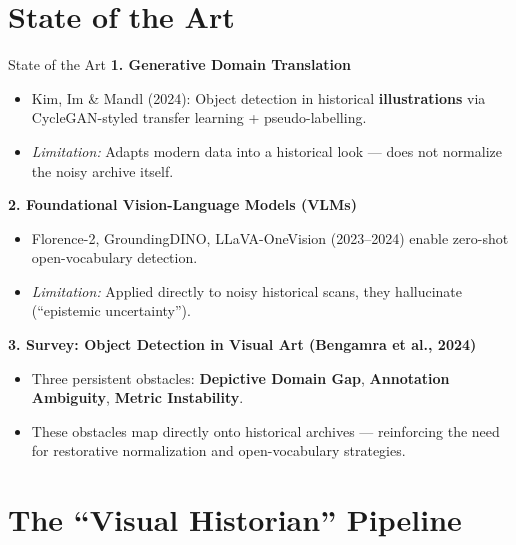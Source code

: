 \documentclass[aspectratio=169, 10pt]{beamer}
\begin{document}
\section{State of the Art}

\begin{frame}{State of the Art}
    \textbf{1. Generative Domain Translation}
    \begin{itemize}
        \item Kim, Im \& Mandl (2024): Object detection in historical \textbf{illustrations} via CycleGAN-styled transfer learning + pseudo-labelling.
        \item \textit{Limitation:} Adapts modern data into a historical look --- does not normalize the noisy archive itself.
    \end{itemize}

    \vspace{0.2cm}
    \textbf{2. Foundational Vision-Language Models (VLMs)}
    \begin{itemize}
        \item Florence-2, GroundingDINO, LLaVA-OneVision (2023--2024) enable zero-shot open-vocabulary detection.
        \item \textit{Limitation:} Applied directly to noisy historical scans, they hallucinate  (``epistemic uncertainty'').
    \end{itemize}

    \vspace{0.2cm}
    \textbf{3. Survey: Object Detection in Visual Art (Bengamra et al., 2024)}
    \begin{itemize}
        \item Three persistent obstacles: \textbf{Depictive Domain Gap}, \textbf{Annotation Ambiguity}, \textbf{Metric Instability}.
        \item These obstacles map directly onto historical archives --- reinforcing the need for restorative normalization and open-vocabulary strategies.
    \end{itemize}
\end{frame}

\section{The ``Visual Historian'' Pipeline}
\end{document}
